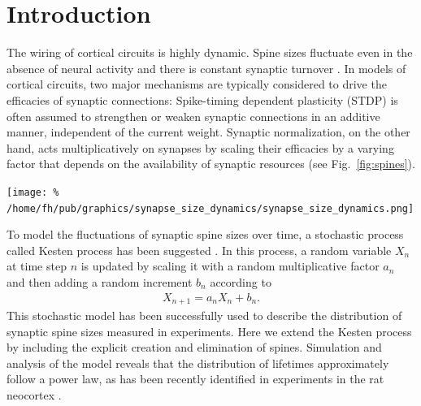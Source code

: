 
\section{Introduction}

The wiring of cortical circuits is highly dynamic. Spine sizes fluctuate even in the absence of neural activity and there is constant synaptic turnover \cite{Loewenstein2015}. In models of cortical circuits, two major mechanisms are typically considered to drive the efficacies of synaptic connections: Spike-timing dependent plasticity (STDP) is often assumed to strengthen or weaken synaptic connections in an additive manner, independent of the current weight. Synaptic normalization, on the other hand, acts multiplicatively on synapses by scaling their efficacies by a varying factor that depends on the availability of synaptic resources \cite{Triesch2017} (see Fig.~\ref{fig:spines}).



\begin{center}\vspace{0.5cm}
  \texttt{[image: \%
    /home/fh/pub/graphics/synapse\_size\_dynamics/synapse\_size\_dynamics.png]} %
  \label{fig:spines}
\end{center}\vspace{2cm}


To model the fluctuations of synaptic spine sizes over time, a stochastic process called Kesten process has been suggested \cite{Kesten1973, Statman2014}. In this process, a random variable $X_n$ at time step $n$ is updated by scaling it with a random multiplicative factor $a_n$ and then adding a random increment $b_n$ according to
%
\begin{align}
  X_{n+1} = a_n X_n + b_n. \label{eq:kesten}
\end{align}
%
This stochastic model has been successfully used to describe the distribution of synaptic spine sizes measured in experiments. Here we extend the Kesten process by including the explicit creation and elimination of spines. Simulation and analysis of the model reveals that the distribution of lifetimes approximately follow a power law, as has been recently identified in experiments in the rat neocortex \cite{Loewenstein2015}.



